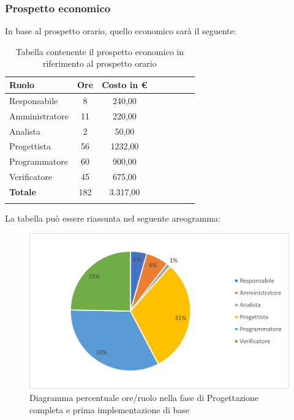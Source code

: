 \subsubsection{Prospetto economico}
In base al prospetto orario, quello economico sarà il seguente:

\begin{longtable}{|l|c|c|c|c|c|c|c|}
	\hline
	\rowcolor{lighter-grayer}
	\textbf{Ruolo}  & \textbf{Ore} & \textbf{Costo in €} \\
	\hline
	\endfirsthead

	\hline
	Responsabile    & 8            & 240,00              \\
	\hline
	\hline
	Amministratore  & 11           & 220,00              \\
	\hline
	\hline
	Analista        & 2            & 50,00               \\
	\hline
	\hline
	Progettista     & 56           & 1232,00             \\
	\hline
	\hline
	Programmatore   & 60           & 900,00              \\
	\hline
	\hline
	Verificatore    & 45           & 675,00              \\
	\hline
	\hline
	\textbf{Totale} & 182          & 3.317,00            \\
	\hline
	\rowcolor{white}
	\caption{Tabella contenente il prospetto economico in riferimento al prospetto orario}
\end{longtable}
\pagebreak

La tabella può essere riassunta nel seguente areogramma:
\begin{figure}[H]
	\centering
	\includegraphics[width=0.8\linewidth]{res/images/preventivo/5-2.png}
	\caption{Diagramma percentuale ore/ruolo nella fase di Progettazione completa e prima implementazione di base}
	\label{fig:diagramma costi ruolo fase progettazione completa e prima implementazione di base}
\end{figure}


